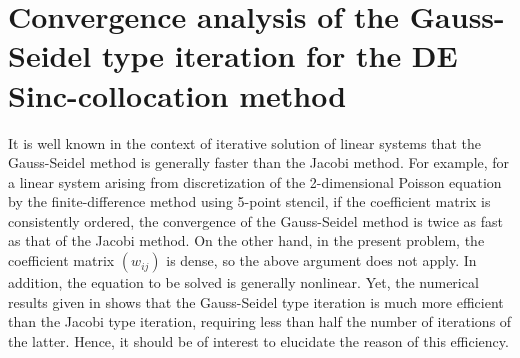 \documentclass[pdflatex,sn-mathphys-num]{sn-jnl}%
\theoremstyle{thmstyleone}%
\theoremstyle{thmstyletwo}%
\theoremstyle{thmstylethree}%
\begin{document}
\section{Convergence analysis of the Gauss-Seidel type iteration for the DE Sinc-collocation method}
\label{Analysis}
It is well known in the context of iterative solution of linear systems that the Gauss-Seidel method is generally faster than the Jacobi method. For example, for a linear system arising from discretization of the 2-dimensional Poisson equation by the finite-difference method using 5-point stencil, if the coefficient matrix is consistently ordered, the convergence of the Gauss-Seidel method is twice as fast as that of the Jacobi method. On the other hand, in the present problem, the coefficient matrix $(w_{ij})$ is dense, so the above argument does not apply. In addition, the equation to be solved is generally nonlinear. Yet, the numerical results given in \cite{Ogata23} shows that the Gauss-Seidel type iteration is much more efficient than the Jacobi type iteration, requiring less than half the number of iterations of the latter. Hence, it should be of interest to elucidate the reason of this efficiency.
\end{document}

